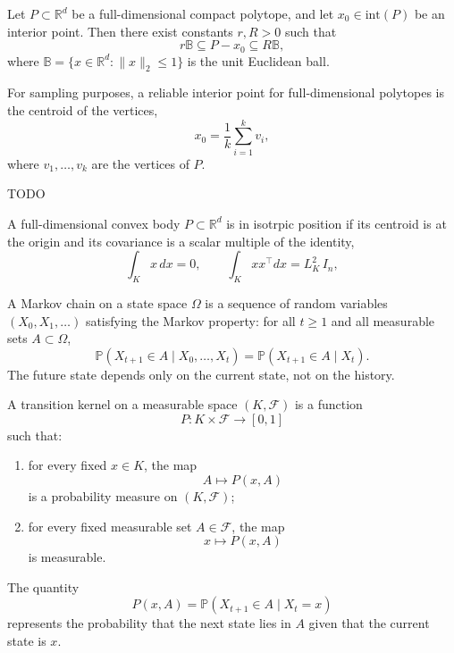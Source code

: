 \begin{proposition}
Let $P \subset \mathbb{R}^d$ be a full-dimensional compact polytope, and let $x_0 \in \mathrm{int}(P)$ be an interior point. Then there exist constants $r, R > 0$ such that
\[
r \mathbb{B} \subseteq P - x_0 \subseteq R \mathbb{B},
\]
where $\mathbb{B} = \{x \in \mathbb{R}^d : \|x\|_2 \le 1\}$ is the unit Euclidean ball.
\end{proposition}

For sampling purposes, a reliable interior point for full-dimensional polytopes is the centroid of the vertices,
\[
x_0 = \frac{1}{k} \sum_{i=1}^{k} v_i,
\]
where $v_1, \ldots, v_k$ are the vertices of $P$.

\begin{definition}
TODO
\end{definition}

\begin{definition}
A full-dimensional convex body $P \subset \mathbb{R}^d$ is in isotrpic position if its centroid is at the origin and its covariance is a scalar multiple of the identity,
\[
\int_K x \, dx = 0, \qquad \int_K x x^\top dx = L_K^2 \, I_n,
\]
\end{definition}

\begin{definition}
A Markov chain on a state space $\Omega$ is a sequence of random variables $(X_0,X_1,\dotsc)$ satisfying the Markov property: for all $t\geq 1$ and all measurable sets $A \subset \Omega$,
\[
\mathbb{P}(X_{t+1} \in A \mid X_0, \ldots, X_t) = \mathbb{P}(X_{t+1} \in A \mid X_t).
\]
The future state depends only on the current state, not on the history.
\end{definition}

\begin{definition}
A transition kernel on a measurable space $(K,\mathcal{F})$ is a function
\[
P : K \times \mathcal{F} \to [0,1]
\]
such that:
\begin{enumerate}
    \item for every fixed $x \in K$, the map
    \[
    A \mapsto P(x,A)
    \]
    is a probability measure on $(K,\mathcal{F})$;
    
    \item for every fixed measurable set $A \in \mathcal{F}$, the map
    \[
    x \mapsto P(x,A)
    \]
    is measurable.
\end{enumerate}

The quantity
\[
P(x,A)=\mathbb{P}(X_{t+1}\in A \mid X_t=x)
\]
represents the probability that the next state lies in $A$ given that the current state is $x$.
\end{definition}

